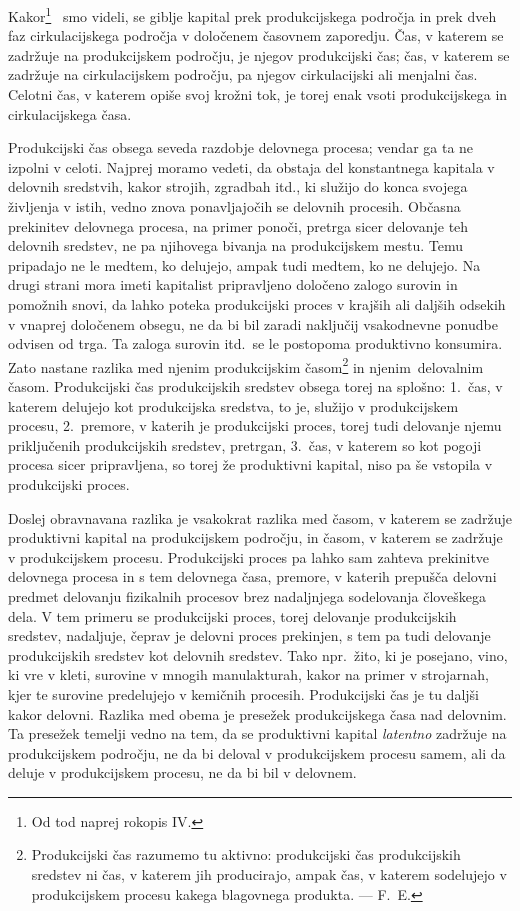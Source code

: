 \documentclass[kapital_02.tex]{subfiles}
\begin{document}
Kakor\footnote{Od tod naprej rokopis IV.}%
\KPEstran\ smo videli, se giblje kapital prek produkcijskega področja in prek dveh faz cirkulacijskega področja v določenem časovnem zaporedju. Čas, v katerem se zadržuje na produkcijskem področju, je njegov produkcijski čas; čas, v katerem se zadržuje na cirkulacijskem področju, pa njegov cirkulacijski ali menjalni čas. Celotni čas, v katerem opiše svoj krožni tok, je torej enak vsoti produkcijskega in cirkulacijskega časa.

Produkcijski čas obsega seveda razdobje delovnega procesa; vendar ga ta ne izpolni v celoti.
Najprej moramo vedeti, da obstaja del konstantnega kapitala v delovnih sredstvih, kakor strojih, zgradbah itd., ki služijo do konca svojega življenja v istih, vedno znova ponavljajočih se delovnih procesih. 
Občasna prekinitev delovnega procesa, na primer ponoči, pretrga sicer delovanje teh delovnih sredstev, ne pa njihovega bivanja na produkcijskem mestu.
Temu pripadajo ne le medtem, ko delujejo, ampak tudi medtem, ko ne delujejo.
Na drugi strani mora imeti kapitalist pripravljeno določeno zalogo surovin in pomožnih snovi, da lahko poteka produkcijski proces v krajših ali daljših odsekih v vnaprej določenem obsegu, ne da bi bil zaradi naključij vsakodnevne ponudbe odvisen od trga. 
Ta zaloga surovin itd.\ se le postopoma produktivno konsumira.
Zato nastane razlika med njenim produkcijskim časom\footnote{Produkcijski čas razumemo tu aktivno: produkcijski čas produkcijskih sredstev ni čas, v katerem jih producirajo, ampak čas, v katerem sodelujejo v produkcijskem procesu kakega blagovnega produkta. — F.\ E.} 
in njenim\KPEstran\ delovalnim časom.
Produkcijski čas produkcijskih sredstev obsega torej na splošno: 1.\ čas, v katerem delujejo kot produkcijska sredstva, to je, služijo v produkcijskem procesu, 2.\ premore, v katerih je produkcijski proces, torej tudi delovanje njemu priključenih produkcijskih sredstev, pretrgan, 3.\ čas, v katerem so kot pogoji procesa sicer pripravljena, so torej že produktivni kapital, niso pa še vstopila v produkcijski proces.

Doslej obravnavana razlika je vsakokrat razlika med časom, v katerem se zadržuje produktivni kapital na produkcijskem področju, in časom, v katerem se zadržuje v produkcijskem procesu.
Produkcijski proces pa lahko sam zahteva prekinitve delovnega procesa in s tem delovnega časa, premore, v katerih prepušča delovni predmet delovanju fizikalnih procesov brez nadaljnjega sodelovanja človeškega dela.
V tem primeru se produkcijski proces, torej delovanje produkcijskih sredstev, nadaljuje, čeprav je delovni proces prekinjen, s tem pa tudi delovanje produkcijskih sredstev kot delovnih sredstev.
Tako npr.\ žito, ki je posejano, vino, ki vre v kleti, surovine v mnogih manulakturah, kakor na primer v strojarnah, kjer te surovine predelujejo v kemičnih procesih.
Produkcijski čas je tu daljši kakor delovni.
Razlika med obema je presežek produkcijskega časa nad delovnim.
Ta presežek temelji vedno na tem, da se produktivni kapital \emph{latentno} zadržuje na produkcijskem področju, ne da bi deloval v produkcijskem procesu samem, ali da deluje v produkcijskem procesu, ne da bi bil v delovnem.
\end{document}
